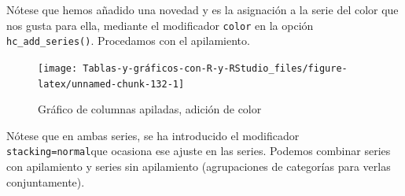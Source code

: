 \documentclass[
]{book}
\newenvironment{Shaded}{\begin{snugshade}}{\end{snugshade}}
\newcommand{\AttributeTok}[1]{\textcolor[rgb]{0.77,0.63,0.00}{#1}}
\newcommand{\ConstantTok}[1]{\textcolor[rgb]{0.00,0.00,0.00}{#1}}
\newcommand{\FunctionTok}[1]{\textcolor[rgb]{0.00,0.00,0.00}{#1}}
\newcommand{\NormalTok}[1]{#1}
\newcommand{\SpecialCharTok}[1]{\textcolor[rgb]{0.00,0.00,0.00}{#1}}
\newcommand{\StringTok}[1]{\textcolor[rgb]{0.31,0.60,0.02}{#1}}
\begin{document}
Nótese que hemos añadido una novedad y es la asignación a la serie del color que nos gusta para ella, mediante el modificador \texttt{color} en la opción \texttt{hc\_add\_series()}. Procedamos con el apilamiento.

\begin{Shaded}
\end{Shaded}

\begin{figure}[H]

{\centering \texttt{[image: Tablas-y-gráficos-con-R-y-RStudio\_files/figure-latex/unnamed-chunk-132-1]} 

}

\caption{Gráfico de columnas apiladas, adición de color}\label{fig:unnamed-chunk-132}
\end{figure}

Nótese que en ambas series, se ha introducido el modificador \texttt{stacking=\textquotesingle{}normal\textquotesingle{}}que ocasiona ese ajuste en las series. Podemos combinar series con apilamiento y series sin apilamiento (agrupaciones de categorías para verlas conjuntamente).
\end{document}
